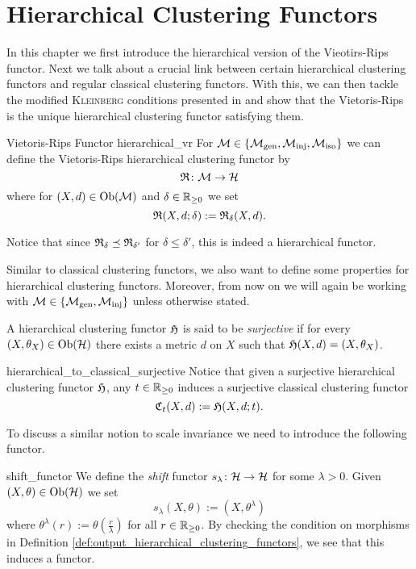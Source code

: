 \chapter{Hierarchical Clustering Functors}
\label{chapter__hierarchical}
In this chapter we first introduce the hierarchical version of the Vieotirs-Rips functor.
Next we talk about a crucial link between certain hierarchical clustering functors and regular classical clustering functors. With this, we can then tackle the modified \textsc{Kleinberg} conditions presented in \cite[Sec.~7.3.1]{Carlsson2010} and show that the Vietoris-Rips is the unique hierarchical clustering functor satisfying them.

\begin{definition}{Vietoris-Rips Functor \cite[Ex.~7.1]{Carlsson2010}}{hierarchical_vr}
For $\mathcal{M} \in \{{\mathcal{M}_\mathrm{gen}},{\mathcal{M}_\mathrm{inj}},{\mathcal{M}_\mathrm{iso}}\}$ we can define the Vietoris-Rips hierarchical clustering functor by
$$
\mathfrak{R}\colon \mathcal{M} \to \mathcal{H}
$$
where for $(X,d) \in \mathrm {Ob}(\mathcal{M})$ and $\delta \in \mathbb R_{\geq0}$ we set
$$
\mathfrak{R}(X,d; \delta) := \mathfrak{R}_\delta(X,d).
$$
\end{definition}
Notice that since $\mathfrak{R}_\delta \preceq \mathfrak{R}_{\delta'}$ for $\delta \leq \delta'$, this is indeed a hierarchical functor.

Similar to classical clustering functors, we also want to define some properties for hierarchical clustering functors. Moreover, from now on we will again be working with $\mathcal{M} \in \{{\mathcal{M}_\mathrm{gen}}, {\mathcal{M}_\mathrm{inj}}\}$ unless otherwise stated.

\begin{definition}{}{}
    A hierarchical clustering functor $\mathfrak{H}$ is said to be \emph{surjective} if for every $(X, \theta_X) \in \mathrm {Ob}(\mathcal{H})$ there exists a metric $d$ on $X$ such that $\mathfrak{H}(X,d) = (X, \theta_X)$.
\end{definition}

\begin{myremark}{}{hierarchical_to_classical_surjective}
Notice that given a surjective hierarchical clustering functor $\mathfrak{H}$, any $t \in \mathbb R_{\geq0}$ induces a surjective classical clustering functor
$$
\mathfrak{C}_t(X,d) := \mathfrak{H}(X, d; t).
$$
\end{myremark}


To discuss a similar notion to scale invariance we need to introduce the following functor.

\begin{definition}{\cite[Ex.~4.3]{Carlsson2010}}{shift_functor}
We define the \emph{shift} functor $s_\lambda\colon \mathcal{H} \to \mathcal{H}$ for some $\lambda > 0$. Given $(X, \theta) \in \mathrm {Ob}(\mathcal{H})$ we set
$$
s_\lambda(X, \theta) := (X, \theta^\lambda)
$$
where $\theta^\lambda(r) := \theta(\frac{r}{\lambda})$ for all $r \in \mathbb R_{\geq0}$.
By checking the condition on morphisms in Definition \ref{def:output_hierarchical_clustering_functors}, we see that this induces a functor.
\end{definition}

